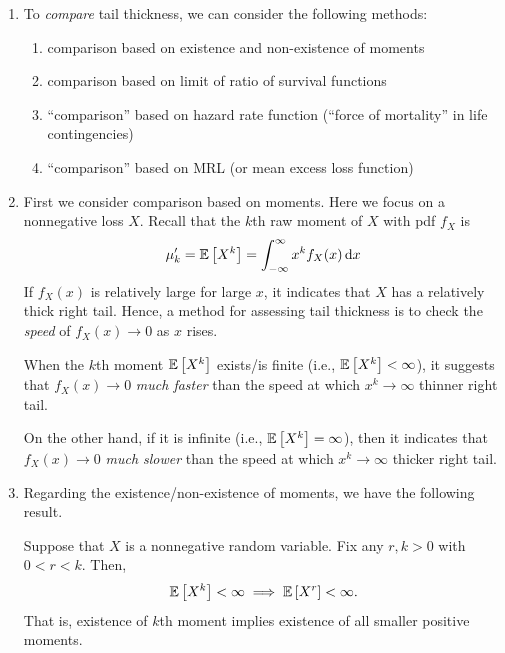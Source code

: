 \begin{enumerate}
\begin{note}
\end{note}
\item To \emph{compare} tail thickness, we can consider the following methods:
\begin{enumerate}
\item comparison based on existence and non-existence of moments
\item comparison based on limit of ratio of survival functions
\item ``comparison'' based on hazard rate function (``force of mortality'' in life contingencies)
\item ``comparison'' based on MRL (or mean excess loss function)
\end{enumerate}
\item First we consider comparison based on moments. Here we focus on a
nonnegative loss \(X\). Recall that the \(k\)th raw moment of \(X\) with pdf
\(f_X\) is
\[
\mu_k'=\mathbb{E}\left[X^k\right]=\int_{-\infty}^{\infty}x^kf_X(x)\dd{x}
\]
If \(f_X(x)\) is relatively large for large \(x\), it indicates that \(X\) has
a relatively thick right tail. Hence, a method for assessing tail thickness is
to check the \emph{speed} of \(f_X(x)\to 0\) as \(x\) rises.

When the \(k\)th moment \(\mathbb{E}\left[X^k\right]\) exists/is finite (i.e.,
\(\mathbb{E}\left[X^k\right]<\infty\)), it suggests that \(f_X(x)\to 0\) \emph{much faster} than the
speed at which \(x^k\to\infty\)  thinner right tail.

On the other hand, if it is infinite (i.e., \(\mathbb{E}\left[X^k\right]=\infty\)), then it
indicates that \(f_X(x)\to 0\) \emph{much slower} than the speed at which
\(x^k\to\infty\)  thicker right tail.

\item Regarding the existence/non-existence of moments, we have the following
result.
\begin{proposition}
\label{prp:high-low-moment-relation}
Suppose that \(X\) is a nonnegative random variable. Fix any \(r,k>0\) with
\(0<r<k\). Then,
\[
\mathbb{E}\left[X^k\right]<\infty\implies \mathbb{E}\left[X^r\right]<\infty.
\]
That is, existence of \(k\)th moment implies existence of
all smaller positive moments.


\end{proposition}
\end{enumerate}
